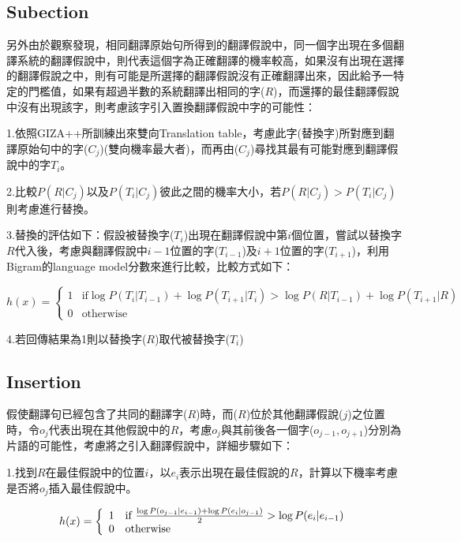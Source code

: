 \subsection{Subection}
\label{sec:subection}
另外由於觀察發現，相同翻譯原始句所得到的翻譯假說中，同一個字出現在多個翻譯系統的翻譯假說中，則代表這個字為正確翻譯的機率較高，如果沒有出現在選擇的翻譯假說之中，則有可能是所選擇的翻譯假說沒有正確翻譯出來，因此給予一特定的門檻值，如果有超過半數的系統翻譯出相同的字($R$)，而還擇的最佳翻譯假說中沒有出現該字，則考慮該字引入置換翻譯假說中字的可能性：


1.依照GIZA++所訓練出來雙向Translation table，考慮此字(替換字)所對應到翻譯原始句中的字($C_j$)(雙向機率最大者)，而再由($C_j$)尋找其最有可能對應到翻譯假說中的字{$T_i$}。


2.比較$P(R|C_j)$以及$P(T_i|C_j)$彼此之間的機率大小，若$P(R|C_j) > P(T_i|C_j)$則考慮進行替換。


3.替換的評估如下：假設被替換字($T_i$)出現在翻譯假說中第$i$個位置，嘗試以替換字$R$代入後，考慮與翻譯假說中$i-1$位置的字($T_{i-1}$)及$i+1$位置的字($T_{i+1}$)，利用Bigram的language model分數來進行比較，比較方式如下：


\begin{equation} 
	  h(x) = \left\{    
	    \begin{array}{ll}
     1         & \mbox{if} \log P(T_i|T_{i - 1})+\log P(T_{i + 1}|T_i) > \log P(R|T_{i - 1})+\log P(T_{i + 1}|R)\\
     0         & \mbox{otherwise}
    \end{array}
  \right.
  \label{eq:sub}
\end{equation}

4.若回傳結果為1則以替換字($R$)取代被替換字($T_i$)
\subsection{Insertion}
\label{sec:Insertion}

假使翻譯句已經包含了共同的翻譯字($R$)時，而($R$)位於其他翻譯假說($j$)之位置時，令$o_j$代表出現在其他假說中的$R$，考慮$o_j$與其前後各一個字($o_{j-1},o_{j+1}$)分別為片語的可能性，考慮將之引入翻譯假說中，詳細步驟如下：


1.找到$R$在最佳假說中的位置$i$，以$e_i$表示出現在最佳假說的$R$，計算以下機率考慮是否將$o_j$插入最佳假說中。

\begin{equation} 
	  h(x) = \left\{    
	    \begin{array}{ll}
1         & \mbox{if } {{\log P(o_{j - 1} |e_{i - 1} ) + \log P(e_i |o_{j - 1} )} \over 2} > \log P(e_i |e_{i - 1} )\\
0         & \mbox{otherwise}
    \end{array}
  \right.
  \label{eq:ins}
\end{equation}


